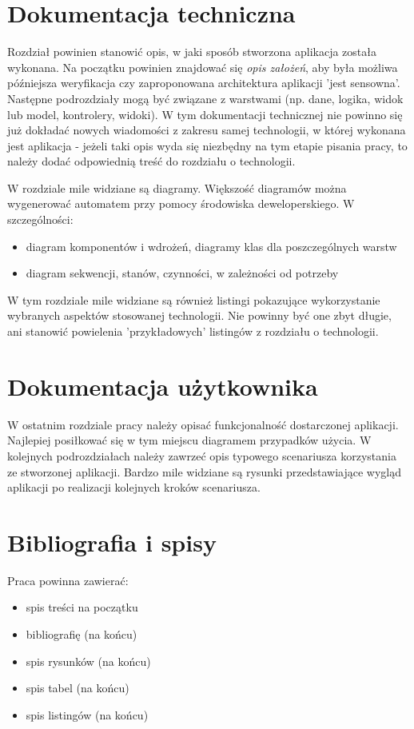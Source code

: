 
\section{Dokumentacja techniczna}
Rozdział powinien stanowić opis, w jaki sposób stworzona aplikacja została wykonana. 
Na początku powinien znajdować się \emph{opis założeń}, aby była możliwa późniejsza weryfikacja czy zaproponowana architektura aplikacji 'jest sensowna'. Następne podrozdziały mogą być związane z warstwami (np. dane, logika, widok lub model, kontrolery, widoki). W tym dokumentacji technicznej nie powinno się już dokładać nowych wiadomości z zakresu samej technologii, w której wykonana jest aplikacja - jeżeli taki opis wyda się niezbędny na tym etapie pisania pracy, to należy dodać odpowiednią treść do rozdziału o technologii.

W rozdziale mile widziane są diagramy. Większość diagramów można wygenerować automatem przy pomocy środowiska deweloperskiego. W szczególności:
\begin{itemize}
\item diagram komponentów i wdrożeń, diagramy klas dla poszczególnych warstw
\item diagram sekwencji, stanów, czynności, w zależności od potrzeby
\end{itemize}

W tym rozdziale mile widziane są również listingi pokazujące wykorzystanie wybranych aspektów stosowanej technologii. Nie powinny być one zbyt długie, ani stanowić powielenia 'przykładowych' listingów z rozdziału o technologii.

\section{Dokumentacja użytkownika}
W ostatnim rozdziale pracy należy opisać funkcjonalność dostarczonej aplikacji. Najlepiej posiłkować się w tym miejscu diagramem przypadków użycia. W kolejnych podrozdziałach należy zawrzeć opis typowego scenariusza korzystania ze stworzonej aplikacji. Bardzo mile widziane są rysunki przedstawiające wygląd aplikacji po realizacji kolejnych kroków scenariusza.

\section{Bibliografia i spisy}
Praca powinna zawierać:
\begin{itemize}
\item spis treści na początku
\item bibliografię (na końcu)
\item spis rysunków (na końcu)
\item spis tabel (na końcu)
\item spis listingów (na końcu)
\end{itemize}


